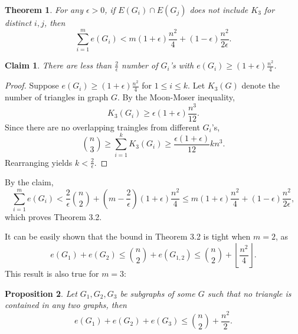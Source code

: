 \documentclass[12pt]{report}
\newtheorem{theorem}{Theorem}[chapter]
\newtheorem{claim}{Claim}[theorem]
\newtheorem{proposition}[theorem]{Proposition}
\begin{document}
\begin{theorem}
	For any $\epsilon > 0$, if $E(G_i) \cap E(G_j)$ does not include $K_3$ for distinct $i, j$, then
	\[
		\sum_{i = 1}^m  e(G_i) < m(1 + \epsilon)\frac{n^2}{4} + (1 - \epsilon)\frac{n^2}{2\epsilon}.
	\]
\end{theorem}

\begin{claim}
	There are less than $\frac{2}{\epsilon}$ number of $G_i$'s with $e(G_i) \geq (1 +
	\epsilon)\frac{n^2}{4}$.
\end{claim}

\begin{proof}
	Suppose $e(G_i) \geq (1 + \epsilon)\frac{n^2}{4}$ for $1\leq i \leq k$. Let $K_3(G)$ denote the
	number of triangles in graph $G$. By the Moon-Moser inequality,
	\[
		K_3(G_i) \geq \epsilon(1 + \epsilon)\frac{n^3}{12}.
	\]
	Since there are no overlapping traingles from different $G_i$'s, 
	\[
		\binom{n}{3} \geq \sum_{i = 1}^k K_3(G_i) \geq \frac{\epsilon(1 + \epsilon)}{12}kn^3.
	\]
	Rearranging yields $k < \frac{2}{\epsilon}$.
\end{proof}

By the claim, 
\[
  \sum_{i = 1}^m e(G_i) < \frac{2}{\epsilon}\binom{n}{2} + \left(m - \frac{2}{\epsilon}\right)(1 + \epsilon)\frac{n^2}{4} \leq m(1 + \epsilon)\frac{n^2}{4} + (1 - \epsilon)\frac{n^2}{2\epsilon},
\]
which proves Theorem 3.2.

It can be easily shown that the bound in Theorem 3.2 is tight when $m = 2$, as
\[
	e(G_1) + e(G_2) \leq \binom{n}{2} + e(G_{1, 2}) \leq \binom{n}{2} + \left\lfloor \frac{n^2}{4} \right\rfloor.
\]
This result is also true for $m = 3$:

\begin{proposition}
	Let $G_1, G_2, G_3$ be subgraphs of some $G$ such that no triangle is contained in any two graphs,
	then
	\[
		e(G_1) + e(G_2) + e(G_3) \leq \binom{n}{2} + \frac{n^2}{2}.
	\]
\end{proposition}
\end{document}
